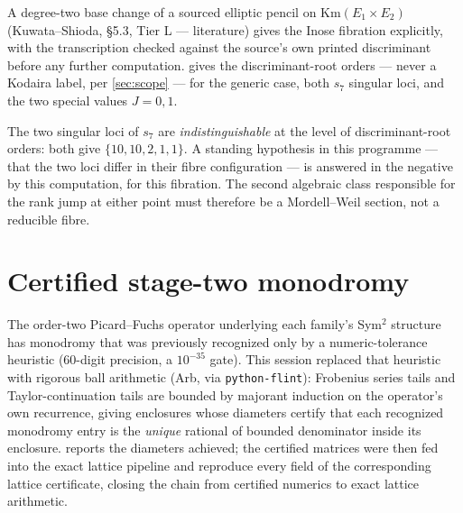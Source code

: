 \documentclass[11pt,a4paper]{article}
\theoremstyle{remark}
\newcommand{\tierL}{\colorbox{blue!10}{\textsf{\scriptsize Tier L --- literature}}}
\begin{document}
A degree-two base change of a sourced elliptic pencil on $\mathrm{Km}(E_1\times E_2)$
(Kuwata--Shioda, \S5.3, \tierL) gives the Inose fibration explicitly, with the transcription checked
against the source's own printed discriminant before any further computation.  gives
the discriminant-root orders --- never a Kodaira label, per \cref{sec:scope} --- for the generic case,
both $s_7$ singular loci, and the two special values $J=0,1$.

\begin{table}[h]
\centering

\caption{Discriminant-root orders of the Inose fibration. The mechanism behind the middle two rows: when
the two elliptic curves become isomorphic, the discriminant's constant term vanishes identically, and
after the base change the two simple roots collapse onto the branch point, producing exactly one
order-$2$ root there.}\label{tab:fibration}
\end{table}

\begin{headlinebox}
The two singular loci of $s_7$ are \emph{indistinguishable} at the level of discriminant-root orders:
both give $\{10,10,2,1,1\}$. A standing hypothesis in this programme --- that the two loci differ in
their fibre configuration --- is answered in the negative by this computation, for this fibration. The
second algebraic class responsible for the rank jump at either point must therefore be a Mordell--Weil
section, not a reducible fibre.
\end{headlinebox}

\section{Certified stage-two monodromy}\label{sec:monodromy}

The order-two Picard--Fuchs operator underlying each family's Sym$^2$ structure has monodromy that was
previously recognized only by a numeric-tolerance heuristic ($60$-digit precision, a $10^{-35}$ gate).
This session replaced that heuristic with rigorous ball arithmetic (Arb, via \texttt{python-flint}):
Frobenius series tails and Taylor-continuation tails are bounded by majorant induction on the operator's
own recurrence, giving enclosures whose diameters certify that each recognized monodromy entry is the
\emph{unique} rational of bounded denominator inside its enclosure.  reports the
diameters achieved; the certified matrices were then fed into the exact lattice pipeline and reproduce
every field of the corresponding lattice certificate, closing the chain from certified numerics to exact
lattice arithmetic.
\end{document}
